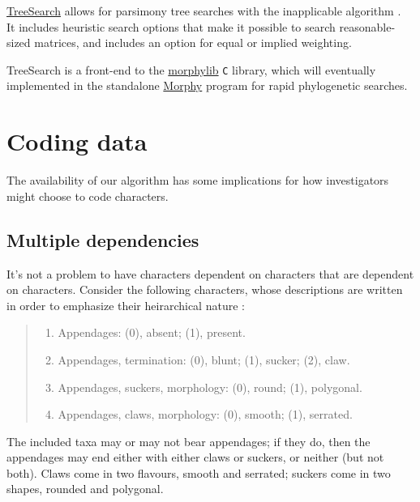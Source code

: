 \documentclass[]{book}
\theoremstyle{definition}
\theoremstyle{definition}
\theoremstyle{definition}
\theoremstyle{remark}
\begin{document}
\href{https://github.com/ms609/TreeSearch}{TreeSearch} allows for
parsimony tree searches with the inapplicable algorithm
\citep{Brazeau2018}.\\
It includes heuristic search options that make it possible to search
reasonable-sized matrices, and includes an option for equal or implied
weighting.

TreeSearch is a front-end to the
\href{https://github.com/mbrazeau/morphylib}{morphylib} \texttt{C}
library, which will eventually implemented in the standalone
\href{http://www.morphyproject.org/}{Morphy} program for rapid
phylogenetic searches.

\hypertarget{coding}{\chapter{Coding data}\label{coding}}

The availability of our algorithm has some implications for how
investigators might choose to code characters.

\section{Multiple dependencies}\label{multiple-dependencies}

It's not a problem to have characters dependent on characters that are
dependent on characters. Consider the following characters, whose
descriptions are written in order to emphasize their heirarchical nature
\citep[following the recommendations of][]{Sereno2007}:

\begin{quote}
\begin{enumerate}
\def\labelenumi{\arabic{enumi}.}
\item
  Appendages: (0), absent; (1), present.
\item
  Appendages, termination: (0), blunt; (1), sucker; (2), claw.
\item
  Appendages, suckers, morphology: (0), round; (1), polygonal.
\item
  Appendages, claws, morphology: (0), smooth; (1), serrated.
\end{enumerate}
\end{quote}

The included taxa may or may not bear appendages; if they do, then the
appendages may end either with either claws or suckers, or neither (but
not both). Claws come in two flavours, smooth and serrated; suckers come
in two shapes, rounded and polygonal.
\end{document}
